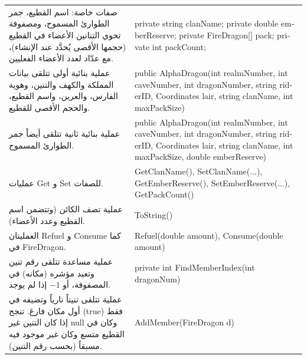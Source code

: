 \documentclass[14pt]{extarticle}
\begin{document}
\begin{enumerate}[label=\textbf{تمرين \arabic*:}, wide=0pt, leftmargin=*, itemsep=2.2em]
    {\centering
    \renewcommand{\arraystretch}{1.2}
    \small
    \begin{tabular}{|>{\raggedleft\arraybackslash}p{}|>{\raggedright\arraybackslash}p{}|}
    \hline
    \multicolumn{2}{|c|}{\textbf{الفئة الفرعية: \textenglish{AlphaDragon : BasicDragon}}} \\
    \hline
    صفات خاصة: اسم القطيع، جمر الطوارئ المسموح، ومصفوفة تحوي التنانين الأعضاء في القطيع (حجمها الأقصى يُحدَّد عند الإنشاء)، مع عدّاد لعدد الأعضاء الفعليين. & \textenglish{private string clanName;} \newline \textenglish{private double emberReserve;} \newline \textenglish{private FireDragon[] pack;} \newline \textenglish{private int packCount;} \\
    \hline
    عملية بنائية أولى تتلقى بيانات المملكة والكهف والتنين، وهوية الفارس، والعرين، واسم القطيع، والحجم الأقصى للقطيع. & \textenglish{public AlphaDragon(int realmNumber, int caveNumber, int dragonNumber, string riderID, Coordinates lair, string clanName, int maxPackSize)} \\
    \hline
    عملية بنائية ثانية تتلقى أيضاً جمر الطوارئ المسموح. & \textenglish{public AlphaDragon(int realmNumber, int caveNumber, int dragonNumber, string riderID, Coordinates lair, string clanName, int maxPackSize, double emberReserve)} \\
    \hline
    عمليات \textenglish{Get} و \textenglish{Set} للصفات. & \textenglish{GetClanName(), SetClanName(...),} \newline \textenglish{GetEmberReserve(), SetEmberReserve(...), GetPackCount()} \\
    \hline
    عملية تصف الكائن (وتتضمن اسم القطيع وعدد الأعضاء). & \textenglish{ToString()} \\
    \hline
    العمليتان \textenglish{Refuel} و \textenglish{Consume} كما في \textenglish{FireDragon}. & \textenglish{Refuel(double amount), Consume(double amount)} \\
    \hline
    عملية مساعدة تتلقى رقم تنين وتعيد مؤشره (مكانه) في المصفوفة، أو $-1$ إذا لم يوجد. & \textenglish{private int FindMemberIndex(int dragonNum)} \\
    \hline
    عملية تتلقى تنيناً نارياً وتضيفه في أول مكان فارغ. تنجح (\textenglish{true}) فقط إذا كان التنين غير \textenglish{null} وكان في القطيع متسع وكان غير موجود فيه مسبقاً (بحسب رقم التنين). & \textenglish{AddMember(FireDragon d)} \\
    \hline

\end{tabular}}
\end{enumerate}
\end{document}
